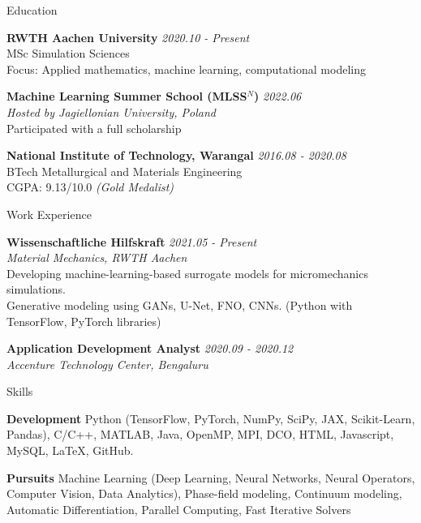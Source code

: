 \documentclass{resume}
\begin{document}
  \begin{rSection}{Education} \itemsep -4pt
    \item {\bf RWTH Aachen University} \hfill {\em 2020.10 - Present}\\
    MSc Simulation Sciences \\
    Focus: Applied mathematics, machine learning, computational modeling 
    \item {\bf Machine Learning Summer School (MLSS\(^N\))} \hfill {\em 2022.06}\\
    {\em Hosted by Jagiellonian University, Poland}\\
    Participated with a full scholarship
    \item {\bf National Institute of Technology, Warangal} \hfill {\em 2016.08 - 2020.08} \\
    BTech Metallurgical and Materials Engineering\hfill \\
    {CGPA: 9.13/10.0} \emph{(Gold Medalist)}
  \end{rSection}

  \begin{rSection}{Work Experience}
    \item {\bf Wissenschaftliche Hilfskraft} \hfill {\em 2021.05 - Present}\\
    {\em Material Mechanics, RWTH Aachen}\\
    Developing machine-learning-based surrogate models for micromechanics simulations. \\Generative modeling using GANs, U-Net, FNO, CNNs. (Python with TensorFlow, PyTorch libraries)
    \item {\bf Application Development Analyst} \hfill {\em 2020.09 - 2020.12}\\
    {\em Accenture Technology Center, Bengaluru}
  \end{rSection}

  \begin{rSection}{Skills}\itemsep -4pt 
    \item \textbf{Development} \textemdash  Python (TensorFlow, PyTorch, NumPy, SciPy, JAX, Scikit-Learn, Pandas), C/C++, MATLAB, Java, OpenMP, MPI, DCO,  HTML, Javascript, MySQL, {\LaTeX}, GitHub.
    \item \textbf{Pursuits} \textemdash Machine Learning (Deep Learning, Neural Networks, Neural Operators, Computer Vision, Data Analytics), Phase-field modeling, Continuum modeling, Automatic Differentiation, Parallel Computing, Fast Iterative Solvers
  \end{rSection}
  
\end{document}
